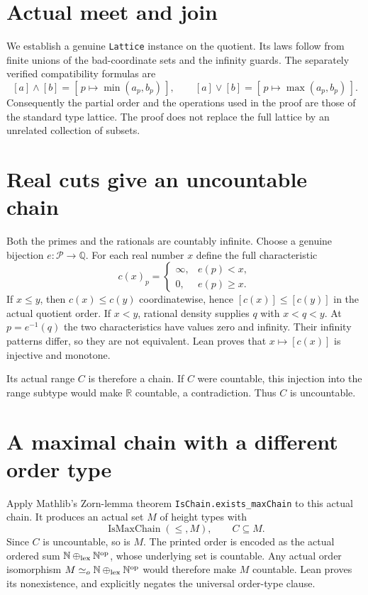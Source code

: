 \documentclass[11pt]{article}
\begin{document}
\newpage
\section{Actual meet and join}
We establish a genuine \texttt{Lattice} instance on the quotient.
Its laws follow from finite unions of the bad-coordinate sets and
the infinity guards. The separately verified compatibility formulas
are
\[
 [a]\wedge[b]=[\,p\mapsto\min(a_p,b_p)\,],\qquad
 [a]\vee[b]=[\,p\mapsto\max(a_p,b_p)\,].
\]
Consequently the partial order and the operations used in the proof
are those of the standard type lattice. The proof does not replace
the full lattice by an unrelated collection of subsets.

\section{Real cuts give an uncountable chain}
Both the primes and the rationals are countably infinite. Choose a
genuine bijection $e:\mathcal P\longrightarrow\mathbb Q$. For each
real number $x$ define the full characteristic
\[
 c(x)_p=\begin{cases}
 \infty,&e(p)<x,\\
 0,&e(p)\ge x.
 \end{cases}
\]
If $x\le y$, then $c(x)\le c(y)$ coordinatewise, hence
$[c(x)]\le[c(y)]$ in the actual quotient order. If $x<y$, rational
density supplies $q$ with $x<q<y$. At $p=e^{-1}(q)$ the two
characteristics have values zero and infinity. Their infinity
patterns differ, so they are not equivalent. Lean proves that
$x\mapsto[c(x)]$ is injective and monotone.

Its actual range $C$ is therefore a chain. If $C$ were countable,
this injection into the range subtype would make $\mathbb R$
countable, a contradiction. Thus $C$ is uncountable.

\section{A maximal chain with a different order type}
Apply Mathlib's Zorn-lemma theorem
\texttt{IsChain.exists\_maxChain} to this actual chain. It produces
an actual set $M$ of height types with
\[
 \operatorname{IsMaxChain}(\le,M),\qquad C\subseteq M.
\]
Since $C$ is uncountable, so is $M$. The printed order is encoded as
the actual ordered sum $\mathbb N\mathbin{\oplus_{\rm lex}}\mathbb N^{\rm op}$,
whose underlying set is countable. Any actual order isomorphism
$M\simeq_o\mathbb N\mathbin{\oplus_{\rm lex}}\mathbb N^{\rm op}$
would therefore make $M$ countable. Lean proves its nonexistence,
and explicitly negates the universal order-type clause.
\end{document}
